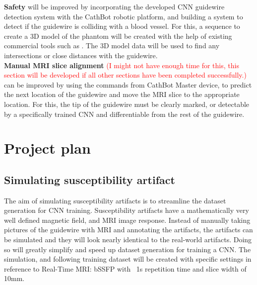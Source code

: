 \documentclass{article}
\begin{document}
\textbf{Safety} will be improved by incorporating the developed CNN guidewire detection system with the CathBot robotic platform, and building a system to detect if the guidewire is colliding with a blood vessel. For this, a sequence to create a 3D model of the phantom will be created with the help of existing commercial tools such as \cite{slicer}. The 3D model data will be used to find any intersections or close distances with the guidewire.\\

\textbf{Manual MRI slice alignment} \textcolor{red}{(I might not have enough time for this, this section will be developed if all other sections have been completed successfully.)} can be improved by using the commands from CathBot Master device, to predict the next location of the guidewire and move the MRI slice to the appropriate location. For this, the tip of the guidewire must be clearly marked, or detectable by a specifically trained CNN and differentiable from the rest of the guidewire.


\section{Project plan}

\subsection{Simulating susceptibility artifact}
The aim of simulating susceptibility artifacts is to streamline the dataset generation for CNN training. Susceptibility artifacts have a mathematically very well defined magnetic field, and MRI image response. Instead of manually taking pictures of the guidewire with MRI and annotating the artifacts, the artifacts can be simulated and they will look nearly identical to the real-world artifacts. Doing so will greatly simplify and speed up dataset generation for training a CNN. The simulation, and following training dataset will be created with specific settings in reference to Real-Time MRI: bSSFP with ~1s repetition time and slice width of 10mm.
\end{document}
